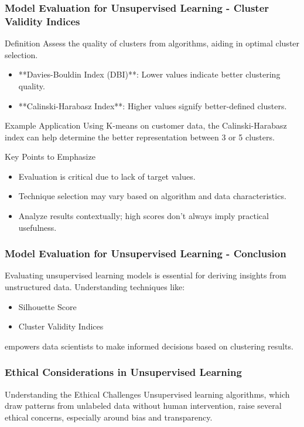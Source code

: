 \documentclass[aspectratio=169]{beamer}
\begin{document}
\begin{frame}[fragile]
    \frametitle{Model Evaluation for Unsupervised Learning - Cluster Validity Indices}
    \begin{block}{Definition}
        Assess the quality of clusters from algorithms, aiding in optimal cluster selection.
    \end{block}
    \begin{itemize}
        \item **Davies-Bouldin Index (DBI)**: Lower values indicate better clustering quality.
        \item **Calinski-Harabasz Index**: Higher values signify better-defined clusters.
    \end{itemize}

    \begin{block}{Example Application}
        Using K-means on customer data, the Calinski-Harabasz index can help determine the better representation between 3 or 5 clusters.
    \end{block}
    
    \begin{block}{Key Points to Emphasize}
        \begin{itemize}
            \item Evaluation is critical due to lack of target values.
            \item Technique selection may vary based on algorithm and data characteristics.
            \item Analyze results contextually; high scores don’t always imply practical usefulness.
        \end{itemize}
    \end{block}
\end{frame}

\begin{frame}[fragile]
    \frametitle{Model Evaluation for Unsupervised Learning - Conclusion}
    Evaluating unsupervised learning models is essential for deriving insights from unstructured data. Understanding techniques like:
    \begin{itemize}
        \item Silhouette Score
        \item Cluster Validity Indices
    \end{itemize}
    empowers data scientists to make informed decisions based on clustering results.
\end{frame}

\begin{frame}
    \frametitle{Ethical Considerations in Unsupervised Learning}
    \begin{block}{Understanding the Ethical Challenges}
        Unsupervised learning algorithms, which draw patterns from unlabeled data without human intervention, raise several ethical concerns, especially around bias and transparency.
    \end{block}
\end{frame}
\end{document}
